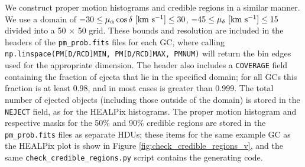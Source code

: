 \documentclass[twocolumn]{aastex631}
\begin{document}
We construct proper motion histograms and credible regions in a similar manner.
We use a domain of $-30 \le \mu_\alpha \cos \delta~{\rm [km~s^{-1}]} \le 30$, $-45 \le \mu_\delta~{\rm [km~s^{-1}]} \le 15$ divided into a 50 $\times$ 50 grid.
These bounds and resolution are included in the headers of the \texttt{pm\_prob.fits} files for each GC, where calling \texttt{np.linspace(PM[D/RCD]MIN, PM[D/RCD]MAX, PMNUM)} will return the bin edges used for the appropriate dimension.
The header also includes a \texttt{COVERAGE} field containing the fraction of ejecta that lie in the specified domain; for all GCs this fraction is at least 0.98, and in most cases is greater than 0.999.
The total number of ejected objects (including those outside of the domain) is stored in the \texttt{NEJECT} field, as for the HEALPix histograms.
The proper motion histogram and respective masks for the 50\% and 90\% credible regions are stored in the \texttt{pm\_prob.fits} files as separate HDUs; these items for the same example GC as the HEALPix plot is show in Figure \ref{fig:check_credible_regions_v}, and the same \texttt{check\_credible\_regions.py} script contains the generating code.


\end{document}
